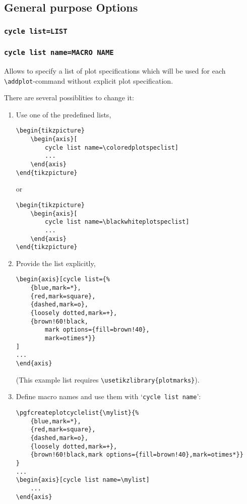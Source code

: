 \subsection{General purpose Options}

\subsubsection{\texttt{cycle list=LIST}}
\label{sec:cycle:list}%
\subsubsection{\texttt{cycle list name=MACRO NAME}}
Allows to specify a list of plot specifications which will be used for each \hbox{\lstinline!\addplot!}-command without explicit plot specification.

There are several possiblities to change it:
\begin{enumerate}
	\item Use one of the predefined lists,
\begin{lstlisting}
\begin{tikzpicture}
	\begin{axis}[
		cycle list name=\coloredplotspeclist]
		...
	\end{axis}
\end{tikzpicture}
\end{lstlisting}
or
\begin{lstlisting}
\begin{tikzpicture}
	\begin{axis}[
		cycle list name=\blackwhiteplotspeclist]
		...
	\end{axis}
\end{tikzpicture}
\end{lstlisting}
	\item Provide the list explicitly,
\begin{lstlisting}
\begin{axis}[cycle list={%
	{blue,mark=*},
	{red,mark=square},
	{dashed,mark=o},
	{loosely dotted,mark=+},
	{brown!60!black,
		mark options={fill=brown!40},
		mark=otimes*}}
]
...
\end{axis}
\end{lstlisting}
	(This example list requires \lstinline!\usetikzlibrary{plotmarks}!).
	\item Define macro names and use them with `\texttt{cycle list name}':
\begin{lstlisting}
\pgfcreateplotcyclelist{\mylist}{%
	{blue,mark=*},
	{red,mark=square},
	{dashed,mark=o},
	{loosely dotted,mark=+},
	{brown!60!black,mark options={fill=brown!40},mark=otimes*}}
}
...
\begin{axis}[cycle list name=\mylist]
	...
\end{axis}
\end{lstlisting}
\end{enumerate}

